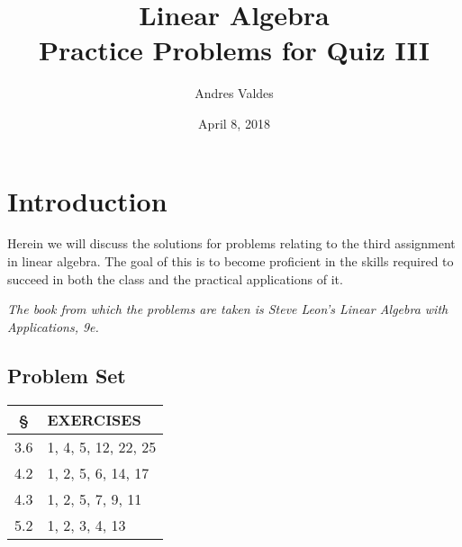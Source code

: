 \documentclass[12pt, letterpaper]{article}
\title{Linear Algebra \\
        \large Practice Problems for Quiz III}
\author{Andres Valdes}
\date{April 8, 2018}
\theoremstyle{remark}
\theoremstyle{remark}
\begin{document}
        
        \begin{titlepage}
        
            \maketitle
        
        \end{titlepage}
    
        \section*{Introduction}
            
        Herein we will discuss the solutions for problems
        relating to the third assignment in linear algebra. The 
        goal of this is to become proficient in the skills required
        to succeed in both the class and the practical applications
        of it.
    
        \bigskip
        \noindent
        \textit{\small *The book from which the problems are taken is
        Steve Leon's Linear Algebra with Applications, 9e.}
        
        \begin{center}
            
            \section*{Problem Set}
    
            \begin{tabular}{|c|l|} 
                
                \hline
                § & \textbf{EXERCISES} \\ 
                \hline\hline
                3.6 & 1, 4, 5, 12, 22, 25 \\ 
                \hline
                4.2 & 1, 2, 5, 6, 14, 17  \\
                \hline
                4.3 & 1, 2, 5, 7, 9, 11  \\
                \hline
                5.2 & 1, 2, 3, 4, 13 \\ 
                \hline
    
            \end{tabular}
        
        \end{center}
    
        \pagebreak
    
\end{document}
